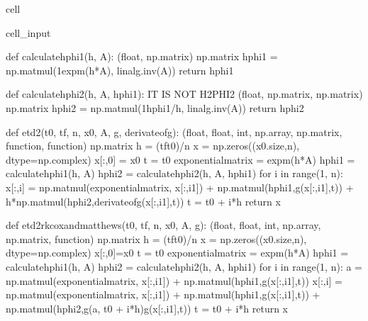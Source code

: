 \documentclass[letterpaper,10pt,english]{jupyterBook}
\begin{document}
\begin{sphinxuseclass}{cell}
\begin{sphinxVerbatimInput}
\begin{sphinxuseclass}{cell_input}
\begin{sphinxVerbatim}[commandchars=\\\{\}]
def calculate\PYGZus{}hphi1(h, A):
    \PYGZsq{}\PYGZsq{}\PYGZsq{}(float, np.matrix) \PYGZhy{}\PYGZgt{} np.matrix\PYGZsq{}\PYGZsq{}\PYGZsq{}
    hphi1 = np.matmul(1\PYGZhy{}expm(\PYGZhy{}h*A), linalg.inv(A))
    return hphi1

def calculate\PYGZus{}hphi2(h, A, hphi1):
    \PYGZsh{}IT IS NOT H2PHI2
    \PYGZsq{}\PYGZsq{}\PYGZsq{}(float, np.matrix, np.matrix) \PYGZhy{}\PYGZgt{} np.matrix\PYGZsq{}\PYGZsq{}\PYGZsq{}
    hphi2 = np.matmul(1\PYGZhy{}hphi1/h, linalg.inv(A))
    return hphi2

def etd2(t0, tf, n, x0, A, g, derivate\PYGZus{}of\PYGZus{}g):
    \PYGZsq{}\PYGZsq{}\PYGZsq{}(float, float, int, np.array, np.matrix, function, function) \PYGZhy{}\PYGZgt{} np.matrix\PYGZsq{}\PYGZsq{}\PYGZsq{}
    h = (tf\PYGZhy{}t0)/n
    x = np.zeros((x0.size,n), dtype=np.complex\PYGZus{})
    x[:,0] = x0
    t = t0
    exponential\PYGZus{}matrix = expm(\PYGZhy{}h*A)
    hphi1 = calculate\PYGZus{}hphi1(h, A)
    hphi2 = calculate\PYGZus{}hphi2(h, A, hphi1)
    for i in range(1, n):
        x[:,i] = np.matmul(exponential\PYGZus{}matrix, x[:,i\PYGZhy{}1]) + np.matmul(hphi1,g(x[:,i\PYGZhy{}1],t)) + h*np.matmul(hphi2,derivate\PYGZus{}of\PYGZus{}g(x[:,i\PYGZhy{}1],t))
        t = t0 + i*h
    return x

def etd2rk\PYGZus{}cox\PYGZus{}and\PYGZus{}matthews(t0, tf, n, x0, A, g):
    \PYGZsq{}\PYGZsq{}\PYGZsq{}(float, float, int, np.array, np.matrix, function) \PYGZhy{}\PYGZgt{} np.matrix\PYGZsq{}\PYGZsq{}\PYGZsq{}
    h = (tf\PYGZhy{}t0)/n
    x = np.zeros((x0.size,n), dtype=np.complex\PYGZus{})
    x[:,0]=x0
    t = t0
    exponential\PYGZus{}matrix = expm(\PYGZhy{}h*A)
    hphi1 = calculate\PYGZus{}hphi1(h, A)
    hphi2 = calculate\PYGZus{}hphi2(h, A, hphi1)
    for i in range(1, n):
        a = np.matmul(exponential\PYGZus{}matrix, x[:,i\PYGZhy{}1]) + np.matmul(hphi1,g(x[:,i\PYGZhy{}1],t))
        x[:,i] = np.matmul(exponential\PYGZus{}matrix, x[:,i\PYGZhy{}1]) + np.matmul(hphi1,g(x[:,i\PYGZhy{}1],t)) + np.matmul(hphi2,g(a, t0 + i*h)\PYGZhy{}g(x[:,i\PYGZhy{}1],t))
        t = t0 + i*h
    return x


\end{sphinxVerbatim}
\end{sphinxuseclass}
\end{sphinxVerbatimInput}
\end{sphinxuseclass}
\end{document}
